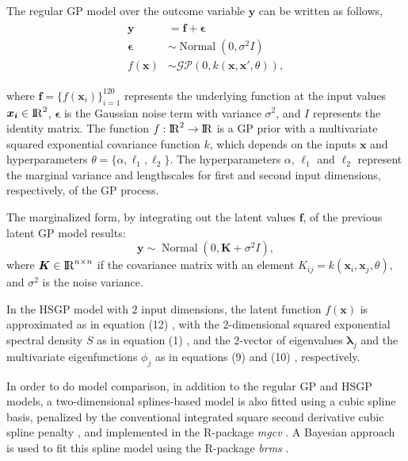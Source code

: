 \documentclass[onecolumn,a4paper,11pt]{article}
\DeclareMathOperator{\Normal}{Normal}
\begin{document}
The regular GP model over the outcome variable $\bm{y}$ can be written as follows,
%
\begin{eqnarray*}\label{ch5_eq_latentgp_simudata2}
\begin{split}
\bm{y} &= \bm{f} + \bm{\epsilon} \\
\bm{\epsilon} &\sim \Normal(0, \sigma^2  I) \\
f(\bm{x}) &\sim \mathcal{GP}(0, k(\bm{x}, \bm{x}', \theta)),
\end{split}
\end{eqnarray*}

\noindent where $\bm{f}=\{f(\bm{x}_i)\}_{i=1}^{120}$ represents the underlying function at the input values $\bm{x_i}\in {\rm I\!R}^{2}$, $\bm{\epsilon}$ is the Gaussian noise term with variance $\sigma^2$, and $I$ represents the identity matrix. The function $f:{\rm I\!R}^2 \to {\rm I\!R}$ is a GP prior with a multivariate squared exponential covariance function $k$, which depends on the inputs $\bm{x}$ and hyperparameters $\theta=\{\alpha,\ell_1,\ell_2\}$. The hyperparameters $\alpha$, $\ell_1$ and $\ell_2$ represent the marginal variance and lengthscales for first and second input dimensions, respectively, of the GP process.

The marginalized form, by integrating out the latent values $\bm{f}$, of the previous latent GP model results:
%
\begin{equation*}\label{ch5_eq_marginalizedgp_simudata2}
\bm{y} \sim \Normal(0, \bm{K} + \sigma^2 I ),
\end{equation*}
%
where $\bm{K} \in {\rm I\!R}^{n\times n}$ if the covariance matrix with an element $K_{ij}=k(\bm{x}_i,\bm{x}_j,\theta)$, and $\sigma^2$ is the noise variance.

In the HSGP model with $2$ input dimensions, the latent function $f(\bm{x})$ is approximated as in equation (12)%
, with the $2$-dimensional squared exponential spectral density $S$ as in equation (1)%
, and the $2$-vector of eigenvalues $\bm{\lambda}_j$ and the multivariate eigenfunctions $\phi_j$ as in equations (9) %
 and (10)%
 , respectively.


In order to do model comparison, in addition to the regular GP and HSGP models, a two-dimensional splines-based model is also fitted using a cubic spline basis, penalized by the conventional integrated square second derivative cubic spline penalty \citep{wood2017generalized}, and implemented in the R-package \textit{mgcv} \citep{wood2011mgcv}. A Bayesian approach is used to fit this spline model using the R-package \textit{brms} \citep{burkner2017brms}.
\end{document}
